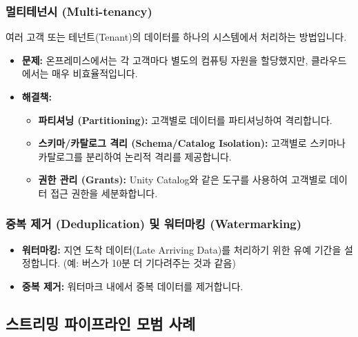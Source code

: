 \documentclass[11pt,a4paper]{article}
\theoremstyle{definition}
\begin{document}
\subsubsection{멀티테넌시 (Multi-tenancy)}
여러 고객 또는 테넌트(Tenant)의 데이터를 하나의 시스템에서 처리하는 방법입니다.
\begin{itemize}
    \item \textbf{문제:} 온프레미스에서는 각 고객마다 별도의 컴퓨팅 자원을 할당했지만, 클라우드에서는 매우 비효율적입니다.
    \item \textbf{해결책:}
    \begin{itemize}
        \item \textbf{파티셔닝 (Partitioning):} 고객별로 데이터를 파티셔닝하여 격리합니다.
        \item \textbf{스키마/카탈로그 격리 (Schema/Catalog Isolation):} 고객별로 스키마나 카탈로그를 분리하여 논리적 격리를 제공합니다.
        \item \textbf{권한 관리 (Grants):} Unity Catalog와 같은 도구를 사용하여 고객별로 데이터 접근 권한을 세분화합니다.
    \end{itemize}
\end{itemize}

\subsubsection{중복 제거 (Deduplication) 및 워터마킹 (Watermarking)}
\begin{itemize}
    \item \textbf{워터마킹:} 지연 도착 데이터(Late Arriving Data)를 처리하기 위한 유예 기간을 설정합니다. (예: 버스가 10분 더 기다려주는 것과 같음)
    \item \textbf{중복 제거:} 워터마크 내에서 중복 데이터를 제거합니다.
\end{itemize}

\subsection{스트리밍 파이프라인 모범 사례}
\end{document}
